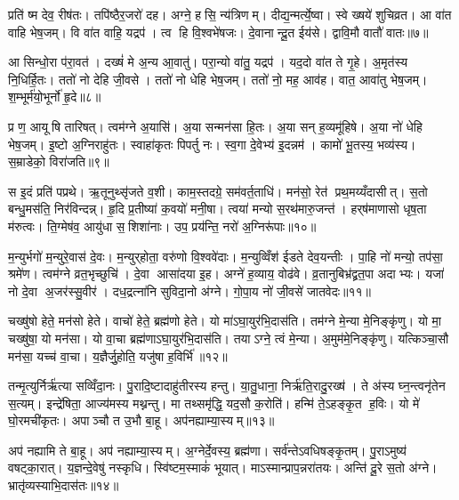 प्रति॑ ष्म देव॒ रीष॑तः। तपि॑ष्ठैर॒जरो॑ दह। अग्ने॒ हसि॒ न्य॑त्रिणम्। दीद्य॒न्मर्त्ये॒ष्वा। स्वे ख्षये॑ शुचिव्रत। आ वा॑त वाहि भेष॒जम्। वि वा॑त वाहि॒ यद्रप॑। त्व हि वि॒श्वभे॑षजः। दे॒वानान्दू॒त ईय॑से। द्वावि॒मौ वातौ॑ वातः॥७॥

आ सिन्धो॒रा प॑रा॒वत॑। दख्षं॑ मे अ॒न्य आ॒वातु॑। परा॒न्यो वा॑तु॒ यद्रप॑। यद॒दो वा॑त ते गृ॒हे। अ॒मृत॑स्य नि॒धिर्\mbox{}हि॒तः। ततो॑ नो देहि जी॒वसे। ततो॑ नो धेहि भेष॒जम्। ततो॑ नो॒ मह॒ आव॑ह। वात॒ आवा॑तु भेष॒जम्। श॒म्भूर्म॑यो॒भूर्नो॑ हृ॒दे॥८॥

प्र ण॒ आयूषि तारिषत्। त्वम॑ग्ने अ॒यासि॑। अ॒या सन्मन॑सा हि॒तः। अ॒या सन् ह॒व्यमू॑हिषे। अ॒या नो॑ धेहि भेष॒जम्। इ॒ष्टो अ॒ग्निराहु॑तः। स्वाहा॑कृतः पिपर्तु नः। स्व॒गा दे॒वेभ्य॑ इ॒दन्नम॑। कामो॑ भू॒तस्य॒ भव्य॑स्य। स॒म्राडेको॒ विरा॑जति॥९॥

स इ॒दं प्रति॑ पप्रथे। ऋ॒तूनुथ्सृ॑जते व॒शी। काम॒स्तदग्रे॒ सम॑वर्त॒ताधि॑। मन॑सो॒ रेत॑ प्रथ॒मय्यँदासीत्। स॒तो बन्धु॒मस॑ति॒ निर॑विन्दन्न्। हृ॒दि प्र॒तीष्या॑ क॒वयो॑ मनी॒षा। त्वया॑ मन्यो स॒रथ॑मारु॒जन्त॑। हर्‌ष॑माणासो धृष॒ता म॑रुत्वः। ति॒ग्मेष॑व॒ आयु॑धा स॒शिशा॑नाः। उप॒ प्रय॑न्ति॒ नरो॑ अ॒ग्निरू॑पाः॥१०॥

म॒न्युर्भगो॑ म॒न्युरे॒वास॑ दे॒वः। म॒न्युर्‌होता॒ वरु॑णो वि॒श्ववे॑दाः। म॒न्युव्विँश॑ ईडते देव॒यन्तीः। पा॒हि नो॑ मन्यो॒ तप॑सा॒ श्रमे॑ण। त्वम॑ग्ने व्रत॒भृच्छुचि॑। दे॒वा आसा॑दया इ॒ह। अग्ने॑ ह॒व्याय॒ वोढ॑वे। व्र॒तानुबिभ्र॑द्व्रत॒पा अदाभ्यः। यजा॑ नो दे॒वा अ॒जर॑स्सु॒वीर॑। दध॒द्रत्ना॑नि सुविदा॒नो अ॑ग्ने। गो॒पा॒य नो॑ जी॒वसे॑ जातवेदः॥११॥\anuvakamend[जिघासत्य॒मित्राञ्जघ॒न्वानी॑डते॒ सर्वा॒ अह॑सो वातो हृ॒दे रा॑जत्य॒ग्निरू॑पास्सुविदा॒नो अ॑ग्न॒ एक॑ञ्च]

चख्षु॑षो हेते॒ मन॑सो हेते। वाचो॑ हेते॒ ब्रह्म॑णो हेते। यो मा॑ऽघा॒युर॑भि॒दास॑ति। तम॑ग्ने मे॒न्या मे॒निङ्कृ॑णु। यो मा॒ चख्षु॑षा॒ यो मन॑सा। यो वा॒चा ब्रह्म॑णाऽघा॒युर॑भि॒दास॑ति। तयाऽग्ने॒ त्वं मे॒न्या। अ॒मुम॑मे॒निङ्कृ॑णु। यत्किञ्चा॒सौ मन॑सा॒ यच्च॑ वा॒चा। य॒ज्ञैर्जु॒होति॒ यजु॑षा ह॒विर्भि॑॥१२॥

तन्मृ॒त्युर्निर्\mbox{}ऋ॑त्या सव्विँदा॒नः। पु॒रादि॒ष्टादाहु॑तीरस्य हन्तु। या॒तु॒धाना॒ निर्\mbox{}ऋ॑ति॒रादु॒रख्ष॑। ते अ॑स्य घ्न॒न्त्वनृ॑तेन स॒त्यम्। इन्द्रे॑षिता॒ आज्य॑मस्य मथ्नन्तु। मा तथ्समृ॑द्धि॒ यद॒सौ क॒रोति॑। हन्मि॑ ते॒ऽहङ्कृ॒त ह॒विः। यो मे॑ घो॒रमची॑कृतः। अपाञ्चौ त उ॒भौ बा॒हू। अप॑नह्याम्या॒स्यम्॥१३॥

अप॑ नह्यामि ते बा॒हू। अप॑ नह्याम्या॒स्यम्। अ॒ग्नेर्दे॒वस्य॒ ब्रह्म॑णा। सर्व॑न्तेऽवधिषङ्कृ॒तम्। पु॒राऽमुष्य॑ वषट्का॒रात्। य॒ज्ञन्दे॒वेषु॑ नस्कृधि। स्वि॑ष्टम॒स्माकं॑ भूयात्। माऽस्मान्प्राप॒न्नरा॑तयः। अन्ति॑ दू॒रे स॒तो अ॑ग्ने। भ्रातृ॑व्यस्याभि॒दास॑तः॥१४॥

